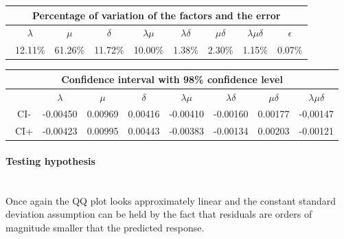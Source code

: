 \documentclass{article}
\begin{document}
                    \begin{table}[htbp]
                        \centering 
                        \begin{tabular}{|c|c|c|c|c|c|c|c|}
                            \hline
                            \multicolumn{8}{|c|}{\bf Percentage of variation of the factors and the error} \\
                            \hline
                            \ $\lambda$ & $\mu$ & $\delta$ & $\lambda\mu$ & $\lambda\delta$ & $\mu\delta$ & $\lambda\mu\delta$ & $\epsilon$ \\
                            \hline
                            \ 12.11\% & 61.26\% & 11.72\% & 10.00\% & 1.38\% & 2.30\% & 1.15\% & 0.07\% \\ 
                            \hline
                        \end{tabular}
                        \label{table:variation_5}
                    \end{table}
                    
                    \begin{table}[htbp]
                        \begin{tabular}{|c|c|c|c|c|c|c|c|}
                        
                            \hline
                            \multicolumn{8}{|c|}{\bf Confidence interval with 98\% confidence level} \\
                                
                            \hline
                            \ & $\lambda$ & $\mu$ & $\delta$ & $\lambda\mu$ & $\lambda\delta$ & $\mu\delta$ & $\lambda\mu\delta$\\
                            \hline
                            \ CI- & -0.00450 & 0.00969 & 0.00416 & -0.00410 & -0.00160 & 0.00177 & -0,00147 \\ 
                            \hline
                            \ CI+ & -0.00423 & 0.00995 & 0.00443 & -0.00383 & -0.00134 & 0.00203 & -0.00121 \\ 
                            \hline
                        \end{tabular}
                        \label{table:CI_5}
                    \end{table}
                
                \paragraph{Testing hypothesis} \hfill \\
                Once again the QQ plot looks approximately linear and the constant standard deviation assumption can be held by the fact that residuals are orders of magnitude smaller that the predicted response.
                
\end{document}

